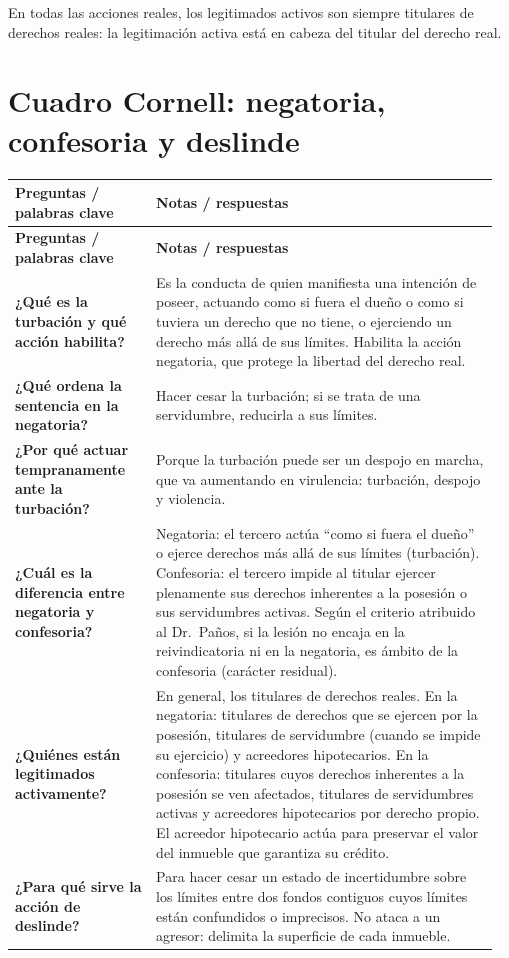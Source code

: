 \documentclass[12pt,oneside]{book}
\makeatletter
\newenvironment{cornell}{%
    \par\vspace{0.5em}
    \begin{longtable}{@{}>{\RaggedRight\arraybackslash}p{0.28\linewidth}
                         >{\RaggedRight\arraybackslash}p{0.68\linewidth}@{}}
    \toprule
    \textbf{Preguntas / palabras clave} & \textbf{Notas / respuestas} \\
    \midrule
    \endfirsthead
    \toprule
    \textbf{Preguntas / palabras clave} & \textbf{Notas / respuestas} \\
    \midrule
    \endhead
}{%
    \bottomrule
    \end{longtable}
}
\makeatother
\begin{document}
En todas las acciones reales, los legitimados activos son siempre titulares de derechos reales: la legitimación activa está en cabeza del titular del derecho real.

\section{Cuadro Cornell: negatoria, confesoria y deslinde}

\begin{cornell}
\textbf{¿Qué es la turbación y qué acción habilita?} &
Es la conducta de quien manifiesta una intención de poseer, actuando como si fuera el dueño o como si tuviera un derecho que no tiene, o ejerciendo un derecho más allá de sus límites. Habilita la acción negatoria, que protege la libertad del derecho real. \\[0.6em]

\textbf{¿Qué ordena la sentencia en la negatoria?} &
Hacer cesar la turbación; si se trata de una servidumbre, reducirla a sus límites. \\[0.6em]

\textbf{¿Por qué actuar tempranamente ante la turbación?} &
Porque la turbación puede ser un despojo en marcha, que va aumentando en virulencia: turbación, despojo y violencia. \\[0.6em]

\textbf{¿Cuál es la diferencia entre negatoria y confesoria?} &
Negatoria: el tercero actúa ``como si fuera el dueño'' o ejerce derechos más allá de sus límites (turbación). Confesoria: el tercero impide al titular ejercer plenamente sus derechos inherentes a la posesión o sus servidumbres activas. Según el criterio atribuido al Dr.\ Paños, si la lesión no encaja en la reivindicatoria ni en la negatoria, es ámbito de la confesoria (carácter residual). \\[0.6em]

\textbf{¿Quiénes están legitimados activamente?} &
En general, los titulares de derechos reales. En la negatoria: titulares de derechos que se ejercen por la posesión, titulares de servidumbre (cuando se impide su ejercicio) y acreedores hipotecarios. En la confesoria: titulares cuyos derechos inherentes a la posesión se ven afectados, titulares de servidumbres activas y acreedores hipotecarios por derecho propio. El acreedor hipotecario actúa para preservar el valor del inmueble que garantiza su crédito. \\[0.6em]

\textbf{¿Para qué sirve la acción de deslinde?} &
Para hacer cesar un estado de incertidumbre sobre los límites entre dos fondos contiguos cuyos límites están confundidos o imprecisos. No ataca a un agresor: delimita la superficie de cada inmueble. \\


\end{cornell}
\end{document}
